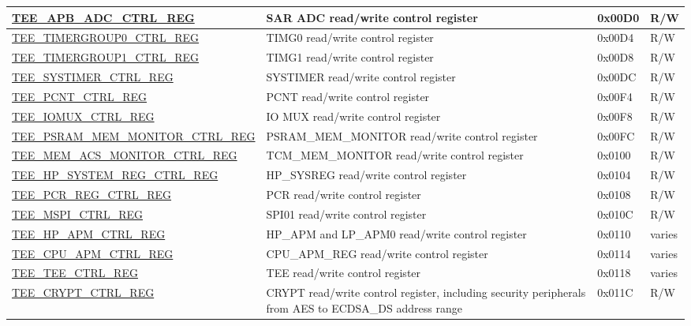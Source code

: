 \begin{longtable}{ | l | L{6cm} | l | l | }
\hyperref[regdesc:TEEAPBADCCTRLREG]{TEE\_APB\_ADC\_CTRL\_REG} & SAR ADC read/write control register & 0x00D0 & R/W \\ \hline
\hyperref[regdesc:TEETIMERGROUP0CTRLREG]{TEE\_TIMERGROUP0\_CTRL\_REG} & TIMG0 read/write control register & 0x00D4 & R/W \\ \hline
\hyperref[regdesc:TEETIMERGROUP1CTRLREG]{TEE\_TIMERGROUP1\_CTRL\_REG} & TIMG1 read/write control register & 0x00D8 & R/W \\ \hline
\hyperref[regdesc:TEESYSTIMERCTRLREG]{TEE\_SYSTIMER\_CTRL\_REG} & SYSTIMER read/write control register & 0x00DC & R/W \\ \hline
\hyperref[regdesc:TEEPCNTCTRLREG]{TEE\_PCNT\_CTRL\_REG} & PCNT read/write control register & 0x00F4 & R/W \\ \hline
\hyperref[regdesc:TEEIOMUXCTRLREG]{TEE\_IOMUX\_CTRL\_REG} & IO MUX read/write control register & 0x00F8 & R/W \\ \hline
\hyperref[regdesc:TEEPSRAMMEMMONITORCTRLREG]{TEE\_PSRAM\_MEM\_MONITOR\_CTRL\_REG} & PSRAM\_MEM\_MONITOR read/write control register & 0x00FC & R/W \\ \hline
\hyperref[regdesc:TEEMEMACSMONITORCTRLREG]{TEE\_MEM\_ACS\_MONITOR\_CTRL\_REG} & TCM\_MEM\_MONITOR read/write control register & 0x0100 & R/W \\ \hline
\hyperref[regdesc:TEEHPSYSTEMREGCTRLREG]{TEE\_HP\_SYSTEM\_REG\_CTRL\_REG} & HP\_SYSREG read/write control register & 0x0104 & R/W \\ \hline
\hyperref[regdesc:TEEPCRREGCTRLREG]{TEE\_PCR\_REG\_CTRL\_REG} & PCR read/write control register & 0x0108 & R/W \\ \hline
\hyperref[regdesc:TEEMSPICTRLREG]{TEE\_MSPI\_CTRL\_REG} & SPI01 read/write control register & 0x010C & R/W \\ \hline
\hyperref[regdesc:TEEHPAPMCTRLREG]{TEE\_HP\_APM\_CTRL\_REG} & HP\_APM and LP\_APM0 read/write control register & 0x0110 & varies \\ \hline
\hyperref[regdesc:TEECPUAPMCTRLREG]{TEE\_CPU\_APM\_CTRL\_REG} & CPU\_APM\_REG read/write control register & 0x0114 & varies \\ \hline
\hyperref[regdesc:TEETEECTRLREG]{TEE\_TEE\_CTRL\_REG} & TEE read/write control register & 0x0118 & varies \\ \hline
\hyperref[regdesc:TEECRYPTCTRLREG]{TEE\_CRYPT\_CTRL\_REG} & CRYPT read/write control register, including security peripherals from AES to ECDSA\_DS address range & 0x011C & R/W \\ \hline

\end{longtable}
